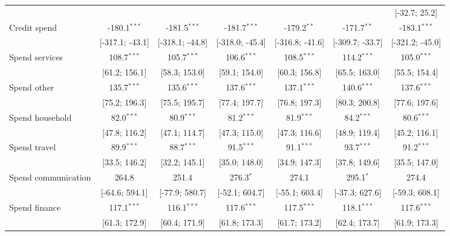 \begin{table}[htbp]
\begin{threeparttable}[b]
\begin{tabular}{lcccccc}
                                   &                 &                 &                 &                 &                 & [-32.7; 25.2]\\   
         Credit spend              & -180.1$^{***}$  & -181.5$^{***}$  & -181.7$^{***}$  & -179.2$^{**}$   & -171.7$^{**}$   & -183.1$^{***}$\\   
                                   & [-317.1; -43.1] & [-318.1; -44.8] & [-318.0; -45.4] & [-316.8; -41.6] & [-309.7; -33.7] & [-321.2; -45.0]\\   
         Spend services            & 108.7$^{***}$   & 105.7$^{***}$   & 106.6$^{***}$   & 108.5$^{***}$   & 114.2$^{***}$   & 105.0$^{***}$\\   
                                   & [61.2; 156.1]   & [58.3; 153.0]   & [59.1; 154.0]   & [60.3; 156.8]   & [65.5; 163.0]   & [55.5; 154.4]\\   
         Spend other               & 135.7$^{***}$   & 135.6$^{***}$   & 137.6$^{***}$   & 137.1$^{***}$   & 140.6$^{***}$   & 137.6$^{***}$\\   
                                   & [75.2; 196.3]   & [75.5; 195.7]   & [77.4; 197.7]   & [76.8; 197.3]   & [80.3; 200.8]   & [77.6; 197.6]\\   
         Spend household           & 82.0$^{***}$    & 80.9$^{***}$    & 81.2$^{***}$    & 81.9$^{***}$    & 84.2$^{***}$    & 80.6$^{***}$\\   
                                   & [47.8; 116.2]   & [47.1; 114.7]   & [47.3; 115.0]   & [47.3; 116.6]   & [48.9; 119.4]   & [45.2; 116.1]\\   
         Spend travel              & 89.9$^{***}$    & 88.7$^{***}$    & 91.5$^{***}$    & 91.1$^{***}$    & 93.7$^{***}$    & 91.2$^{***}$\\   
                                   & [33.5; 146.2]   & [32.2; 145.1]   & [35.0; 148.0]   & [34.9; 147.3]   & [37.8; 149.6]   & [35.5; 147.0]\\   
         Spend communication       & 264.8           & 251.4           & 276.3$^{*}$     & 274.1           & 295.1$^{*}$     & 274.4\\   
                                   & [-64.6; 594.1]  & [-77.9; 580.7]  & [-52.1; 604.7]  & [-55.1; 603.4]  & [-37.3; 627.6]  & [-59.3; 608.1]\\   
         Spend finance             & 117.1$^{***}$   & 116.1$^{***}$   & 117.6$^{***}$   & 117.5$^{***}$   & 118.1$^{***}$   & 117.6$^{***}$\\   
                                   & [61.3; 172.9]   & [60.4; 171.9]   & [61.8; 173.3]   & [61.7; 173.2]   & [62.4; 173.7]   & [61.9; 173.3]\\   

\end{tabular}
\end{threeparttable}
\end{table}
